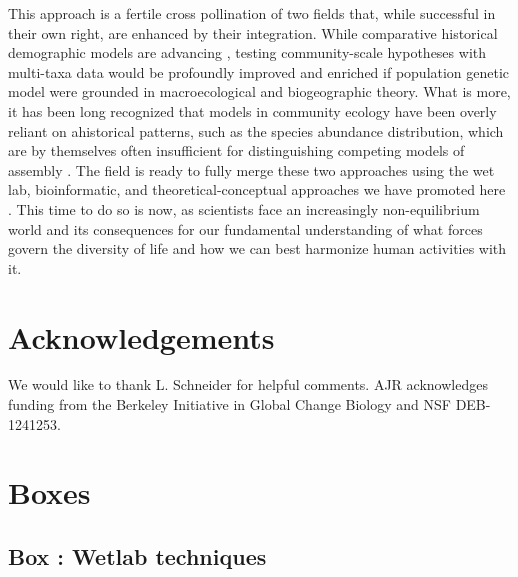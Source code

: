 \documentclass[12pt]{article}
\newcounter{Box}
\providecommand{\DIFdelbegin}{} %
\begin{document}
This approach is a fertile cross pollination of two fields that, while
successful in their own right, are enhanced by their
integration. While comparative historical demographic models are
advancing \citep{Xue2015-el, Hickerson2006-uf, Carstens2016-mc,
  Chan2014-nq, Satler2016-lb}, testing community-scale hypotheses with
multi-taxa data would be profoundly improved and enriched if
population genetic model were grounded in macroecological and
biogeographic theory.  What is more, it has been long recognized that
models in community ecology have been overly reliant on ahistorical
patterns, such as the species abundance distribution, which are by
themselves often insufficient for distinguishing competing models of
assembly \citep{McGill2007-hx}.  The field is ready to
fully merge these two approaches using the wet lab, bioinformatic, and
theoretical-conceptual approaches we have promoted here . This time to do so is now, 
% 
% 
% 
 as scientists face an increasingly
non-equilibrium world and its consequences for our fundamental
understanding of what forces govern the diversity of life and how we
can best harmonize human activities with it.

\section*{Acknowledgements}

We would like to thank L. Schneider for helpful comments. AJR
acknowledges funding from the Berkeley Initiative in Global Change
Biology and NSF DEB-1241253.

\pagebreak




\pagebreak

\section*{Boxes}


\label{box:wet}
\subsection*{Box \theBox: Wetlab techniques}
\DIFdelbegin %
\end{document}
